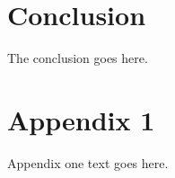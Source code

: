 \documentclass[journal,comsoc]{IEEEtran}
\begin{document}




\section{Conclusion}
The conclusion goes here.






%


\appendices
\section{Appendix 1}
Appendix one text goes here.

  \newpage
\end{document}
